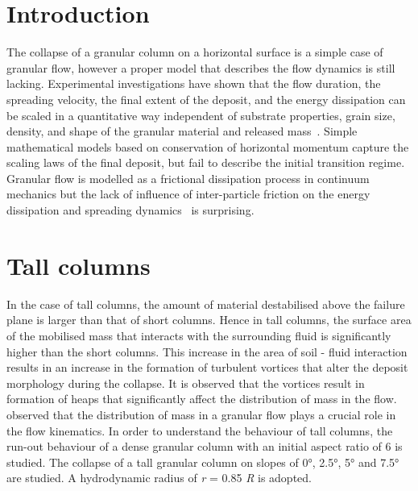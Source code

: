 \documentclass[epj,twocolumn]{webofc}
\begin{document}
\section{Introduction}
The collapse of a granular column on a horizontal surface is a simple case
of granular flow, however a proper model that describes the flow dynamics
is still lacking. Experimental investigations have shown that the flow
duration, the spreading velocity, the final extent of the deposit, and the
energy dissipation can be scaled in a quantitative way independent of
substrate properties, grain size, density, and shape of the granular
material and released mass~\cite{Lajeunesse2005, Lube2005}. Simple
mathematical models based on conservation of horizontal momentum capture
the scaling laws of the final deposit, but fail to describe the initial
transition regime. Granular flow is modelled as a frictional dissipation
process in continuum mechanics but the lack of influence of inter-particle
friction on the energy dissipation and spreading dynamics~\cite{Lube2005}
is surprising.

\section{Tall columns}

In the case of tall columns, the amount of material destabilised above the 
failure plane is larger than that of short columns. Hence in tall columns, 
the surface area of the mobilised mass that interacts with the 
surrounding fluid is significantly higher than the short columns. This 
increase in the area of soil - fluid interaction results in an increase
in the formation of turbulent vortices that alter the deposit morphology during 
the collapse. It is observed that the vortices result in formation of heaps 
that significantly affect the distribution of mass in the flow.
~\citet{Staron2007a} observed that the 
distribution of mass in a granular flow plays a crucial role in the flow 
kinematics. In order to understand the behaviour of tall columns, the run-out 
behaviour of a dense granular column with an initial aspect ratio of 6 is 
studied. The collapse of a tall granular column on slopes of 0\si{\degree}, 
2.5\si{\degree}, 5\si{\degree} and 7.5\si{\degree} are studied. A hydrodynamic 
radius of \textit{r} = 0.85 \textit{R} is adopted. 
\end{document}
